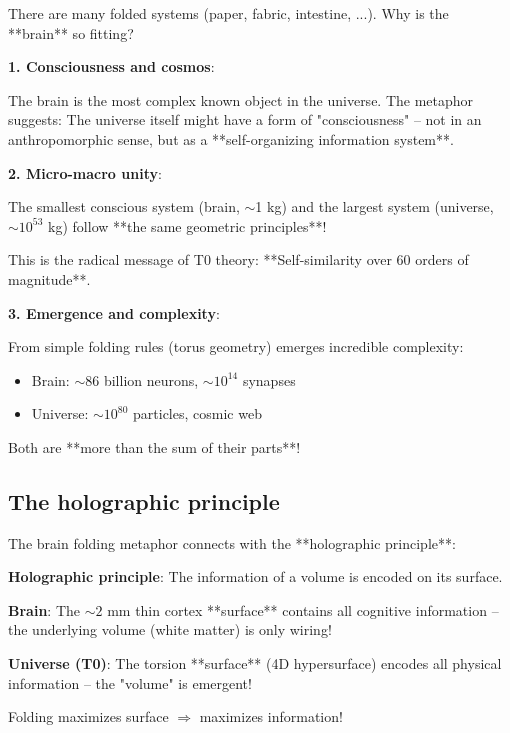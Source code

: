 	There are many folded systems (paper, fabric, intestine, ...). Why is the **brain** so fitting?
	
	\begin{philosophical}
		\textbf{1. Consciousness and cosmos}:
		
		The brain is the most complex known object in the universe. The metaphor suggests: The universe itself might have a form of "consciousness" -- not in an anthropomorphic sense, but as a **self-organizing information system**.
		
		\vspace{0.3cm}
		
		\textbf{2. Micro-macro unity}:
		
		The smallest conscious system (brain, $\sim$1 kg) and the largest system (universe, $\sim 10^{53}$ kg) follow **the same geometric principles**!
		
		This is the radical message of T0 theory: **Self-similarity over 60 orders of magnitude**.
		
		\vspace{0.3cm}
		
		\textbf{3. Emergence and complexity}:
		
		From simple folding rules (torus geometry) emerges incredible complexity:
		\begin{itemize}
			\item Brain: $\sim 86$ billion neurons, $\sim 10^{14}$ synapses
			\item Universe: $\sim 10^{80}$ particles, cosmic web
		\end{itemize}
		
		Both are **more than the sum of their parts**!
	\end{philosophical}
	
	\subsection{The holographic principle}
	
	The brain folding metaphor connects with the **holographic principle**:
	
	\begin{keyresult}[Holography]
		\textbf{Holographic principle}: The information of a volume is encoded on its surface.
		
		\vspace{0.3cm}
		
		\textbf{Brain}: The $\sim 2$ mm thin cortex **surface** contains all cognitive information -- the underlying volume (white matter) is only wiring!
		
		\vspace{0.3cm}
		
		\textbf{Universe (T0)}: The torsion **surface** (4D hypersurface) encodes all physical information -- the "volume" is emergent!
		
		\vspace{0.3cm}
		
		Folding maximizes surface $\Rightarrow$ maximizes information!
	\end{keyresult}
	
